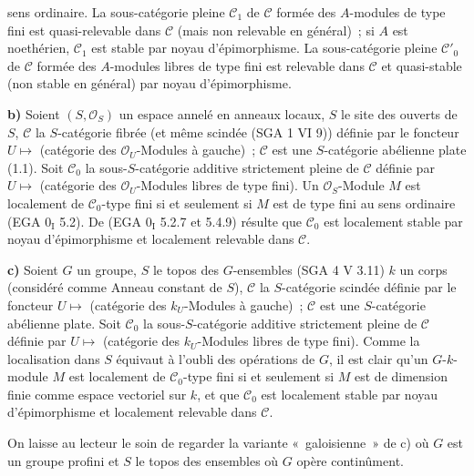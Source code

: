 sens ordinaire. La sous-catégorie pleine \(\mathcal C_1\) de \(\mathcal C\) formée des \(A\)-modules de type fini est quasi-relevable dans \(\mathcal C\) (mais non relevable en général)~; si \(A\) est noethérien, \(\mathcal C_1\) est stable par noyau d'épimorphisme. La sous-catégorie pleine \(\mathcal C'_0\) de \(\mathcal C\) formée des \(A\)-modules libres de type fini est relevable dans \(\mathcal C\) et quasi-stable (non stable en général) par noyau d'épimorphisme.

\textbf{b)} Soient \((S,\mathcal O_S)\) un espace annelé en anneaux locaux, \(S\) le site des ouverts de \(S\), \(\mathcal C\) la \(S\)-catégorie fibrée (et même scindée (SGA 1 VI 9)) définie par le foncteur \(U\longmapsto\) (catégorie des \(\mathcal O_U\)-Modules à gauche)~; \(\mathcal C\) est une \(S\)-catégorie abélienne plate (1.1). Soit \(\mathcal C_0\) la sous-\(S\)-catégorie additive strictement pleine de \(\mathcal C\) définie par \(U\longmapsto\) (catégorie des \(\mathcal O_U\)-Modules libres de type fini). Un \(\mathcal O_S\)-Module \(M\) est localement de \(\mathcal C_0\)-type fini si et seulement si \(M\) est de type fini au sens ordinaire (EGA \(0_{\mathrm I}\) 5.2). De (EGA \(0_{\mathrm I}\) 5.2.7 et 5.4.9) résulte que \(\mathcal C_0\) est localement stable par noyau d'épimorphisme et localement relevable dans \(\mathcal C\).

\textbf{c)} Soient \(G\) un groupe, \(S\) le topos des \(G\)-ensembles (SGA 4 V 3.11) \(k\) un corps (considéré comme Anneau constant de \(S\)), \(\mathcal C\) la \(S\)-catégorie scindée définie par le foncteur \(U\longmapsto\) (catégorie des \(k_U\)-Modules à gauche)~; \(\mathcal C\) est une \(S\)-catégorie abélienne plate. Soit \(\mathcal C_0\) la sous-\(S\)-catégorie additive strictement pleine de \(\mathcal C\) définie par \(U\longmapsto\) (catégorie des \(k_U\)-Modules libres de type fini).
Comme la localisation dans \(S\) équivaut à l'oubli des opérations de \(G\), il est clair qu'un \(G\)-\(k\)-module \(M\) est localement de \(\mathcal C_0\)-type fini si et seulement si \(M\) est de dimension finie comme espace vectoriel sur \(k\), et que \(\mathcal C_0\) est localement stable par noyau d'épimorphisme et localement relevable dans \(\mathcal C\).

On laisse au lecteur le soin de regarder la variante «~galoisienne~» de c) où \(G\) est un groupe profini et \(S\) le topos des ensembles où \(G\) opère continûment.

